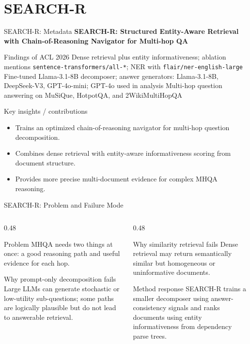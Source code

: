 \section{SEARCH-R}

\begin{frame}{SEARCH-R: Metadata}
\small
\textbf{SEARCH-R: Structured Entity-Aware Retrieval with Chain-of-Reasoning Navigator for Multi-hop QA}

\paperinfo
{Findings of ACL 2026}
{Dense retrieval plus entity informativeness; ablation mentions \texttt{sentence-transformers/all-*}; NER with \texttt{flair/ner-english-large}}
{Fine-tuned Llama-3.1-8B decomposer; answer generators: Llama-3.1-8B, DeepSeek-V3, GPT-4o-mini; GPT-4o used in analysis}
{Multi-hop question answering on MuSiQue, HotpotQA, and 2WikiMultiHopQA}

\begin{block}{Key insights / contributions}
\scriptsize
\begin{itemize}
  \item Trains an optimized chain-of-reasoning navigator for multi-hop question decomposition.
  \item Combines dense retrieval with entity-aware informativeness scoring from document structure.
  \item Provides more precise multi-document evidence for complex MHQA reasoning.
\end{itemize}
\end{block}
\end{frame}

\begin{frame}{SEARCH-R: Problem and Failure Mode}
\scriptsize
\begin{columns}[T,onlytextwidth]
  \begin{column}{0.48\textwidth}
    \begin{block}{Problem}
      MHQA needs two things at once: a good reasoning path and useful evidence for each hop.
    \end{block}
    \begin{block}{Why prompt-only decomposition fails}
      Large LLMs can generate stochastic or low-utility sub-questions; some paths are logically plausible but do not lead to answerable retrieval.
    \end{block}
  \end{column}
  \begin{column}{0.48\textwidth}
    \begin{block}{Why similarity retrieval fails}
      Dense retrieval may return semantically similar but homogeneous or uninformative documents.
    \end{block}
    \begin{block}{Method response}
      SEARCH-R trains a smaller decomposer using answer-consistency signals and ranks documents using entity informativeness from dependency parse trees.
    \end{block}
  \end{column}
\end{columns}
\end{frame}

